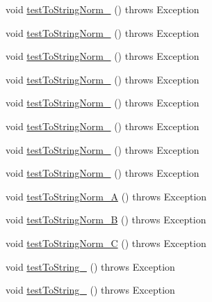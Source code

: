 \begin{DoxyCompactItemize}
\item 
void \hyperlink{classorg_1_1jgap_1_1gp_1_1impl_1_1_program_chromosome_test_a7a51b4d29884b6a47962bcc2ad6d2834}{test\-To\-String\-Norm\-\_} ()  throws Exception 
\item 
void \hyperlink{classorg_1_1jgap_1_1gp_1_1impl_1_1_program_chromosome_test_af9a0f11555ee27d655722a777c055065}{test\-To\-String\-Norm\-\_} ()  throws Exception 
\item 
void \hyperlink{classorg_1_1jgap_1_1gp_1_1impl_1_1_program_chromosome_test_a08c6da7e5322c812c35751f29afdcf41}{test\-To\-String\-Norm\-\_} ()  throws Exception 
\item 
void \hyperlink{classorg_1_1jgap_1_1gp_1_1impl_1_1_program_chromosome_test_a295b2e45ff562cae4e659163987bfef7}{test\-To\-String\-Norm\-\_} ()  throws Exception 
\item 
void \hyperlink{classorg_1_1jgap_1_1gp_1_1impl_1_1_program_chromosome_test_ab26967dff74eb7ce926106d651eefa28}{test\-To\-String\-Norm\-\_} ()  throws Exception 
\item 
void \hyperlink{classorg_1_1jgap_1_1gp_1_1impl_1_1_program_chromosome_test_a11fa54ff33647e288c946b5baca804fe}{test\-To\-String\-Norm\-\_} ()  throws Exception 
\item 
void \hyperlink{classorg_1_1jgap_1_1gp_1_1impl_1_1_program_chromosome_test_a1f5fb051fe01ee9a1295e36b1f71de93}{test\-To\-String\-Norm\-\_} ()  throws Exception 
\item 
void \hyperlink{classorg_1_1jgap_1_1gp_1_1impl_1_1_program_chromosome_test_a19400fb44096c6729ea3820bb7ca690a}{test\-To\-String\-Norm\-\_} ()  throws Exception 
\item 
void \hyperlink{classorg_1_1jgap_1_1gp_1_1impl_1_1_program_chromosome_test_af4152c003fad7eed4831cc9808afa13e}{test\-To\-String\-Norm\-\_\-\-A} ()  throws Exception 
\item 
void \hyperlink{classorg_1_1jgap_1_1gp_1_1impl_1_1_program_chromosome_test_ae22798a626392a4cd0473d7d88959390}{test\-To\-String\-Norm\-\_\-\-B} ()  throws Exception 
\item 
void \hyperlink{classorg_1_1jgap_1_1gp_1_1impl_1_1_program_chromosome_test_a70e74cbd2b1dad2434e43512cba5ab6e}{test\-To\-String\-Norm\-\_\-\-C} ()  throws Exception 
\item 
void \hyperlink{classorg_1_1jgap_1_1gp_1_1impl_1_1_program_chromosome_test_a091f14c8c19b33dc8fa2b03e0690acea}{test\-To\-String\-\_} ()  throws Exception 
\item 
void \hyperlink{classorg_1_1jgap_1_1gp_1_1impl_1_1_program_chromosome_test_a6e6b0581830e43bb3223e9e084ca18c0}{test\-To\-String\-\_} ()  throws Exception 

\end{DoxyCompactItemize}
